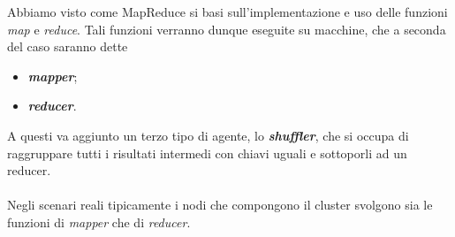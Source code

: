 \documentclass[a4paper,11pt]{report}
\begin{document}
Abbiamo visto come MapReduce si basi sull'implementazione e uso delle funzioni
\emph{map} e \emph{reduce}. Tali funzioni verranno dunque eseguite su macchine, che a seconda del caso
saranno dette 
\begin{itemize}
 \item \emph{\textbf{mapper}};
\item \emph{\textbf{reducer}}.
\end{itemize}
A questi va aggiunto un terzo tipo di agente, lo \emph{\textbf{shuffler}}, che si occupa di raggruppare tutti i risultati intermedi con
chiavi
uguali e sottoporli ad un reducer.
\paragraph{}
Negli scenari reali tipicamente i nodi che compongono il cluster svolgono sia le funzioni di \emph{mapper} che di \emph{reducer}.
\end{document}
